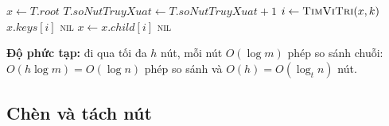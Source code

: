 \begin{algorithm}[htbp]
\caption{Tìm mặt hàng theo mã vạch ()}\label{alg:tim}
\begin{algorithmic}[1]
  \State $x \gets T.\mathit{root}$
    \State $T.\mathit{soNutTruyXuat} \gets T.\mathit{soNutTruyXuat} + 1$
    \State $i \gets \Call{TimViTri}{x, k}$ 
     \State \Return $x.\mathit{keys}[i]$ \EndIf
     \State \Return \textsc{nil} \EndIf
    \State $x \gets x.\mathit{child}[i]$
  \EndWhile
  \State \Return \textsc{nil}
\EndFunction
\end{algorithmic}
\end{algorithm}

\textbf{Độ phức tạp:} đi qua tối đa $h$ nút, mỗi nút $O(\log m)$ phép so sánh chuỗi:
$O(h\log m) = O(\log n)$ phép so sánh và $O(h) = O(\log_t n)$ nút.

\subsection{Chèn và tách nút}

